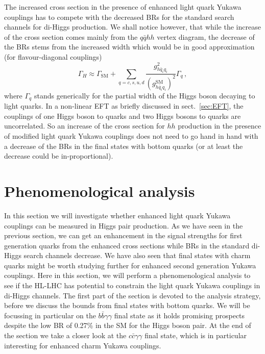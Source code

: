 The increased cross section in the presence of enhanced light quark Yukawa couplings has to compete with the decreased BRs for the standard search channels for di-Higgs production.
We shall notice however, that while the increase of the cross section comes mainly from the $q\bar{q}hh$ vertex diagram, the decrease of the BRs stems from the increased width which would be in good approximation (for flavour-diagonal couplings)
\begin{equation}
	\Gamma_H \approx \Gamma_{\text{SM}}+\sum_{q=c,s,u,d}\frac{g_{h \bar{q}_i q_i}^2}{(g_{h \bar{q}_i q_i}^{\text{SM}})^2}\Gamma_{q}\,,
\end{equation}
where $\Gamma_q$ stands generically for the partial width of the Higgs boson decaying to light quarks.
In a non-linear EFT as briefly discussed in sect.~\ref{sec:EFT}, the couplings of one Higgs boson to quarks and two Higgs bosons to quarks are uncorrelated.
So an increase of the cross section for $hh$ production in the presence of modified light quark Yukawa couplings does not need to go hand in hand with a decrease of the BRs in the final states with bottom quarks (or at least the decrease could be in-proportional).


\section{Phenomenological analysis \label{sec:pheno}}
In this section we will investigate whether enhanced light quark Yukawa couplings can be measured in Higgs pair production. As we have seen in the previous section,
we can get an enhancement in the signal strengths for first generation quarks from the enhanced cross sections while BRs in the standard di-Higgs search channels decrease. We have also seen that final states with charm quarks might be worth studying further for enhanced second generation Yukawa couplings.
Here in this section, we will perform a phenomenological analysis to see if the HL-LHC has potential to constrain the light quark Yukawa couplings in di-Higgs channels.
The first part of the section is devoted to the analysis strategy, before we discuss the bounds from final states with bottom quarks. We will be  focussing in particular on the $b\bar{b}\gamma\gamma$ final state as it holds promising prospects \cite{Azatov:2015oxa, Baur:2003gp, Baglio:2012np, Kling:2016lay, Barger:2013jfa, Adhikary:2017jtu} despite the low BR of 0.27\% in the SM for the Higgs boson pair. At the end of the section we take a closer look at the $c\bar{c}\gamma \gamma$ final state, which is in particular interesting for enhanced charm Yukawa couplings.

